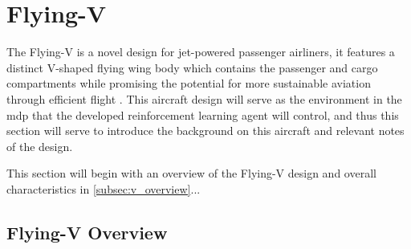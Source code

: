 \documentclass[../report.tex]{subfiles}
\begin{document}



\section{Flying-V}
The Flying-V is a novel design for jet-powered passenger airliners, it features a distinct V-shaped flying wing body which contains the passenger and cargo compartments while promising the potential for more sustainable aviation through efficient flight \cite{benad2015flying, benad2022design}. This aircraft design will serve as the environment in the \ac{mdp} that the developed reinforcement learning agent will control, and thus this section will serve to introduce the background on this aircraft and relevant notes of the design.

This section will begin with an overview of the Flying-V design and overall characteristics in \autoref{subsec:v_overview}...

\subsection{Flying-V Overview}\label{subsec:v_overview}
\end{document}
